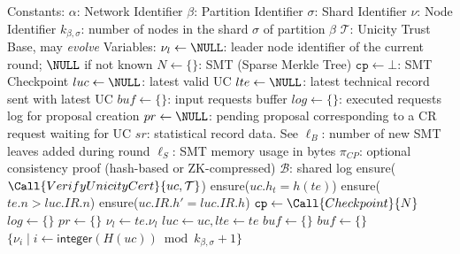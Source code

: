 \begin{algorithm}
  \caption{State and Initialization}\label{alg:init}
  \begin{algorithmic}[0]
    \State Constants:
    \State $\alpha$: Network Identifier
    \State $\beta$: Partition Identifier
    \State $\sigma$: Shard Identifier
    \State $\nu$: Node Identifier
    \State $k_{\beta, \sigma}$: number of nodes in the shard $\sigma$ of partition $\beta$
    \State $\mathcal{T}$: Unicity Trust Base, may \emph{evolve}
    \State Variables:
    \State $\nu_l \gets \NULL$: leader node identifier of the current round; $\NULL$ if not known
    \State $N \gets \{\}$: SMT (Sparse Merkle Tree)
    \State $\mathtt{cp} \gets \bot$: SMT Checkpoint
    \State $luc \gets \NULL$: latest valid UC
    \State $lte \gets \NULL$: latest technical record sent with latest UC
    \State                       {}
    \State                       {}
    \State $buf \gets \{\}$: input requests buffer
    \State $log \gets \{\}$: executed requests log for proposal creation
    \State $pr \gets \NULL$: pending proposal corresponding to a CR request waiting for UC
    \State $sr$: statistical record data. See 
    \State $\ell_B$: number of new SMT leaves added during round
    \State $\ell_S$: SMT memory usage in bytes
    \State $\pi_{CP}$: optional consistency proof (hash-based or ZK-compressed)
    \State $\mathcal{B}$: shared log
    \State
      \State ensure($\Call{VerifyUnicityCert}{uc, \mathcal{T}}$)
      \State ensure($uc.h_t = h(te)$)
      \State ensure($te.n > luc.IR.n$)
      \State ensure($uc.IR.h' = luc.IR.h$)   
      \State $\mathtt{cp} \gets \Call{Checkpoint}{N}$
      \State {}
      \State $log \gets \{\}$
      \State $pr \gets \{\}$
      \State $\nu_l \gets te.\nu_l$
      \State $luc \gets uc, lte \gets te$
      \State {}
           
        \State {}  
        \State $buf \gets \{\}$
      \Else    {}
          \State $buf \gets \{\}$  
        \EndIf
      \EndIf
    \EndFunction
    \State
      \State \Return $\{ \nu_i  \mid  i \gets \mathsf{integer}(H(uc)) \bmod k_{\beta,\sigma} + 1\}$  
    \EndFunction
  \end{algorithmic}
\end{algorithm}

